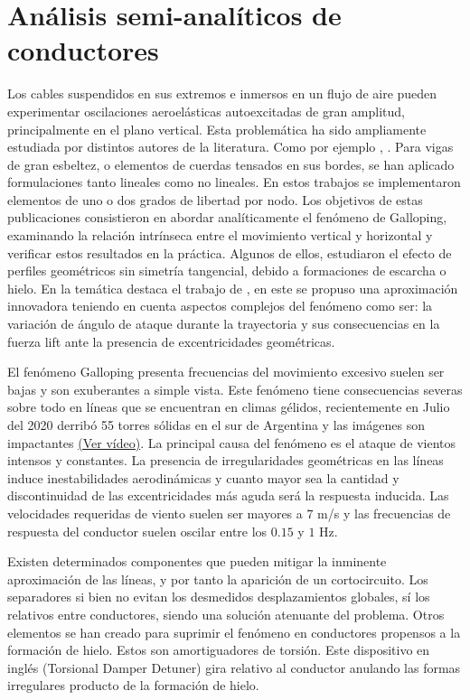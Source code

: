 \section{Análisis semi-analíticos de conductores}\label{Sec:EA:Galloping}

Los cables suspendidos en sus extremos e inmersos en un flujo de aire pueden experimentar oscilaciones aeroelásticas autoexcitadas de gran amplitud, principalmente en el plano vertical. Esta problemática ha sido ampliamente estudiada por distintos autores de la literatura. Como por ejemplo \cite{blevins1990van}, \cite{jones1992coupled}. Para vigas de gran esbeltez, o elementos de cuerdas tensados en sus bordes, se han aplicado formulaciones tanto lineales como no lineales.  En estos trabajos se implementaron elementos de uno o dos grados de libertad por nodo. Los objetivos de estas publicaciones consistieron en abordar analíticamente el fenómeno de Galloping, examinando la relación intrínseca entre el movimiento vertical y horizontal y verificar estos resultados en la práctica. Algunos de ellos, estudiaron el efecto de perfiles geométricos sin simetría tangencial, debido a formaciones de escarcha o hielo. En la temática destaca el trabajo de \cite{chabart1998galloping}, en este se propuso una aproximación innovadora teniendo en cuenta aspectos complejos del fenómeno como ser: la variación de ángulo de ataque durante la trayectoria y sus consecuencias en la fuerza lift ante la presencia de excentricidades geométricas. 

El fenómeno Galloping presenta frecuencias del movimiento excesivo suelen ser bajas y son exuberantes a simple vista. Este fenómeno tiene consecuencias severas sobre todo en líneas que se encuentran en climas gélidos, recientemente en Julio del 2020 derribó 55 torres sólidas en el sur de Argentina y las imágenes son impactantes \href{blob:https://www.clarin.com/df740f0f-cd9a-4b9a-8c55-c594c9ea262c}{(Ver vídeo)}. La principal causa del fenómeno es el ataque de vientos intensos y constantes. La presencia de irregularidades geométricas en las líneas induce inestabilidades aerodinámicas y cuanto mayor sea la cantidad y discontinuidad de las excentricidades más aguda será la respuesta inducida. Las velocidades requeridas de viento suelen ser mayores a $7$ m/s y las frecuencias de respuesta del conductor suelen oscilar entre los $ 0.15$ y $1$ Hz.

Existen determinados componentes que pueden mitigar la inminente aproximación de las líneas, y por tanto la aparición de un cortocircuito. Los separadores si bien no evitan los desmedidos desplazamientos globales, sí los relativos entre conductores, siendo una solución atenuante del problema. Otros elementos se han creado para suprimir el fenómeno en conductores propensos a la formación de hielo. Estos son amortiguadores de torsión. Este dispositivo en inglés (Torsional Damper Detuner) gira relativo al conductor anulando las formas irregulares producto de la formación de hielo.  

